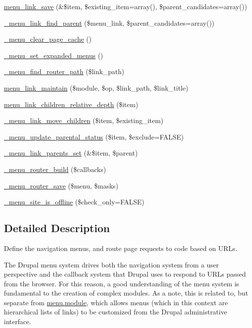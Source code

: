 \begin{DoxyCompactItemize}
\item 
\hyperlink{group__menu_ga133b177fee00b678a19afba18fb81ebc}{menu\_\-link\_\-save} (\&\$item, \$existing\_\-item=array(), \$parent\_\-candidates=array())
\item 
\hyperlink{group__menu_ga4a310e057a335748d2d3c4bd9cb02a15}{\_\-menu\_\-link\_\-find\_\-parent} (\$menu\_\-link, \$parent\_\-candidates=array())
\item 
\hyperlink{group__menu_ga6b3bf9ba8f43f983382911beb62ffba0}{\_\-menu\_\-clear\_\-page\_\-cache} ()
\item 
\hyperlink{group__menu_ga08212e3890c64045fcf6b44032b343a0}{\_\-menu\_\-set\_\-expanded\_\-menus} ()
\item 
\hyperlink{group__menu_ga0842f6b9cf84f5e5ff159159063a78dd}{\_\-menu\_\-find\_\-router\_\-path} (\$link\_\-path)
\item 
\hyperlink{group__menu_gae3248649fb437dedad940df74fb129dc}{menu\_\-link\_\-maintain} (\$module, \$op, \$link\_\-path, \$link\_\-title)
\item 
\hyperlink{group__menu_ga75c0660b49841423d8d3c8908e9023fc}{menu\_\-link\_\-children\_\-relative\_\-depth} (\$item)
\item 
\hyperlink{group__menu_gaeb7542558d6fab7c79b96c1188ee6d67}{\_\-menu\_\-link\_\-move\_\-children} (\$item, \$existing\_\-item)
\item 
\hyperlink{group__menu_ga9df6c2183ab9ee0e934eec54a67761d8}{\_\-menu\_\-update\_\-parental\_\-status} (\$item, \$exclude=FALSE)
\item 
\hyperlink{group__menu_ga67ab71fff6e17ce3c32752c3bfa00d96}{\_\-menu\_\-link\_\-parents\_\-set} (\&\$item, \$parent)
\item 
\hyperlink{group__menu_ga662b13ca71a8b780c9a3b372b25492c3}{\_\-menu\_\-router\_\-build} (\$callbacks)
\item 
\hyperlink{group__menu_gaa7e7e12f5c89718ac147c0e166458135}{\_\-menu\_\-router\_\-save} (\$menu, \$masks)
\item 
\hyperlink{group__menu_ga1bfe1a44b1867b0c02a241b6cc43e50c}{\_\-menu\_\-site\_\-is\_\-offline} (\$check\_\-only=FALSE)
\end{DoxyCompactItemize}


\subsection{Detailed Description}
Define the navigation menus, and route page requests to code based on URLs.

The Drupal menu system drives both the navigation system from a user perspective and the callback system that Drupal uses to respond to URLs passed from the browser. For this reason, a good understanding of the menu system is fundamental to the creation of complex modules. As a note, this is related to, but separate from \hyperlink{menu_8module}{menu.module}, which allows menus (which in this context are hierarchical lists of links) to be customized from the Drupal administrative interface.

